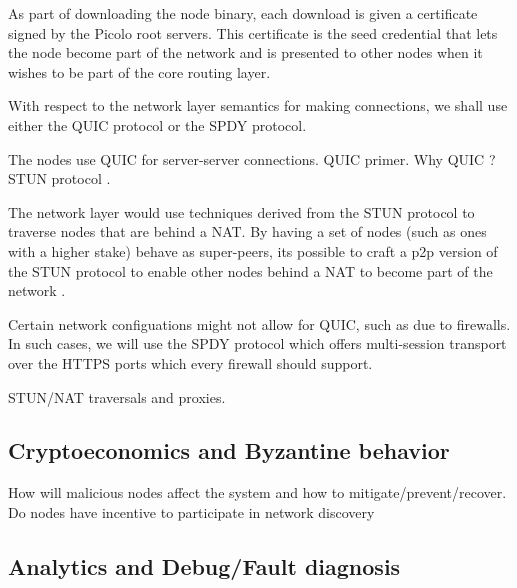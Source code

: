 As part of downloading the node binary, each download is given a certificate signed by the Picolo root servers. This
certificate is the seed credential that lets the node become part of the network and is presented to other nodes when it
wishes to be part of the core routing layer.

With respect to the network layer semantics for making connections, we shall use either the QUIC protocol or the SPDY
protocol.

The nodes use QUIC for server-server connections. QUIC primer. Why QUIC ?
STUN protocol \cite{stun_protocol}.

The network layer would use techniques derived from the STUN protocol to traverse nodes
that are behind a NAT. By having a set of nodes (such as ones with a higher stake) behave as
super-peers, its possible to craft a p2p version of the STUN protocol to enable
other nodes behind a NAT to become part of the network \cite{p2p_nat}.

Certain network configuations might not allow for QUIC, such as due to firewalls. In such cases, we will use the SPDY
protocol which offers multi-session transport over the HTTPS ports which every firewall should support.

STUN/NAT traversals and proxies.

\subsection{Cryptoeconomics and Byzantine behavior}
\label{net:crypto}
How will malicious nodes affect the system and how to mitigate/prevent/recover. Do nodes have incentive to participate in network discovery

\subsection{Analytics and Debug/Fault diagnosis}
\label{net:analytics}

